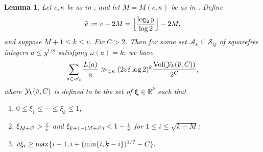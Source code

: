 \documentclass[10pt,a4paper]{amsart}
\newtheorem{lemma}{Lemma}
\renewcommand{\S}{\mathcal{S}}
\DeclareMathOperator{\Vol}{Vol}
\newcommand{\density}{\delta}
\begin{document}
	\begin{lemma}\label{lem from L to Yk}Let $c,\kappa$ be as in , and let $M=M(c,\kappa)$ be as in . Define $$\Tilde{v}:=v-2M=\Big\lfloor\frac{\log_2 y}{\log 2}\Big\rfloor - 2M,$$ and suppose $M+1 \leq k \leq v.$ Fix $C > 2$. Then for some set $\mathscr{A}_k \subseteq \S_Q$ of squarefree integers $a \leq y^{1/8}$ satisfying $\omega(a) = k$, we have
		$$\sum_{\substack{a \in \mathscr{A}_k}} \frac{L(a)}{a} \gg_{c,\kappa} (2v \density \log 2)^k \frac{\Vol(\mathcal{Y}_k(\Tilde{v},C))}{2^C}, $$
		where $\mathcal{Y}_k(\Tilde{v},C)$ is defined to be the set of $\bm{\xi} \in \mathbb{R}^k$ such that
		\begin{enumerate}[label=(\roman*)]
			\item $0 \leq \xi_1 \leq \cdots \leq \xi_k \leq 1$;
			\item $\xi_{M+i^2} > \frac{i}{\Tilde{v}}$ and $\xi_{k+1-(M+i^2)} < 1-\frac{i}{\Tilde{v}}$ for $1 \leq i \leq \sqrt{k-M}$;
			\item $\Tilde{v} \xi_i \geq \max\{i-1, i+ (\min\{i,k-i\})^{1/7}-C\}.$
		\end{enumerate}    
	\end{lemma}
\end{document}

